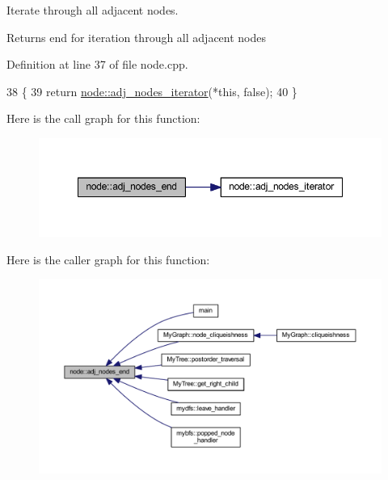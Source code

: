 Iterate through all adjacent nodes.

\begin{DoxyReturn}{Returns}
end for iteration through all adjacent nodes 
\end{DoxyReturn}


Definition at line 37 of file node.\+cpp.


\begin{DoxyCode}
38 \{
39     \textcolor{keywordflow}{return} \mbox{\hyperlink{classnode_a392f19ea6dfa344bdf5c4d5a4b25eb8c}{node::adj\_nodes\_iterator}}(*\textcolor{keyword}{this}, \textcolor{keyword}{false});
40 \}
\end{DoxyCode}
Here is the call graph for this function\+:\nopagebreak
\begin{figure}[H]
\begin{center}
\leavevmode
\includegraphics[width=348pt]{classnode_a2477fa92c56a19d29464082444a3043a_cgraph}
\end{center}
\end{figure}
Here is the caller graph for this function\+:\nopagebreak
\begin{figure}[H]
\begin{center}
\leavevmode
\includegraphics[width=350pt]{classnode_a2477fa92c56a19d29464082444a3043a_icgraph}
\end{center}
\end{figure}
\mbox{\label{classnode_a392f19ea6dfa344bdf5c4d5a4b25eb8c}} 

